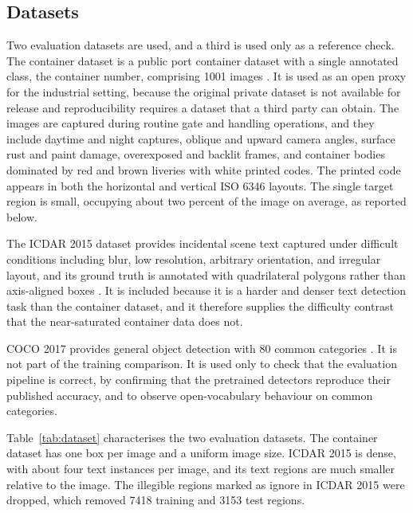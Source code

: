 \documentclass[conference]{IEEEtran}
\begin{document}
\subsection{Datasets}
\label{sec:datasets}

Two evaluation datasets are used, and a third is used only as a reference check. The container dataset is a public port container dataset with a single annotated class, the container number, comprising 1001 images \cite{containerdataset2024}. It is used as an open proxy for the industrial setting, because the original private dataset is not available for release and reproducibility requires a dataset that a third party can obtain. The images are captured during routine gate and handling operations, and they include daytime and night captures, oblique and upward camera angles, surface rust and paint damage, overexposed and backlit frames, and container bodies dominated by red and brown liveries with white printed codes. The printed code appears in both the horizontal and vertical ISO 6346 layouts. The single target region is small, occupying about two percent of the image on average, as reported below.

The ICDAR 2015 dataset provides incidental scene text captured under difficult conditions including blur, low resolution, arbitrary orientation, and irregular layout, and its ground truth is annotated with quadrilateral polygons rather than axis-aligned boxes \cite{icdar2015}. It is included because it is a harder and denser text detection task than the container dataset, and it therefore supplies the difficulty contrast that the near-saturated container data does not.

COCO 2017 provides general object detection with 80 common categories \cite{coco}. It is not part of the training comparison. It is used only to check that the evaluation pipeline is correct, by confirming that the pretrained detectors reproduce their published accuracy, and to observe open-vocabulary behaviour on common categories.

Table~\ref{tab:dataset} characterises the two evaluation datasets. The container dataset has one box per image and a uniform image size. ICDAR 2015 is dense, with about four text instances per image, and its text regions are much smaller relative to the image. The illegible regions marked as ignore in ICDAR 2015 were dropped, which removed 7418 training and 3153 test regions.
\end{document}
